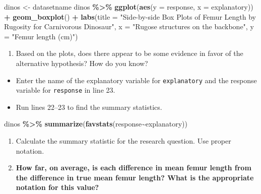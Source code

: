\documentclass[
]{report}
\newenvironment{Shaded}{\begin{snugshade}}{\end{snugshade}}
\newcommand{\AttributeTok}[1]{\textcolor[rgb]{0.13,0.29,0.53}{#1}}
\newcommand{\FunctionTok}[1]{\textcolor[rgb]{0.13,0.29,0.53}{\textbf{#1}}}
\newcommand{\NormalTok}[1]{#1}
\newcommand{\OtherTok}[1]{\textcolor[rgb]{0.56,0.35,0.01}{#1}}
\newcommand{\SpecialCharTok}[1]{\textcolor[rgb]{0.81,0.36,0.00}{\textbf{#1}}}
\newcommand{\StringTok}[1]{\textcolor[rgb]{0.31,0.60,0.02}{#1}}
\providecommand{\tightlist}{%
  \setlength{\itemsep}{0pt}\setlength{\parskip}{0pt}}
\begin{document}
\begin{Shaded}
\begin{Highlighting}[]
\NormalTok{dinos }\OtherTok{\textless{}{-}}\NormalTok{ datasetname}
\NormalTok{dinos }\SpecialCharTok{\%\textgreater{}\%}
  \FunctionTok{ggplot}\NormalTok{(}\FunctionTok{aes}\NormalTok{(}\AttributeTok{y =}\NormalTok{ response, }\AttributeTok{x =}\NormalTok{ explanatory)) }\SpecialCharTok{+}
  \FunctionTok{geom\_boxplot}\NormalTok{() }\SpecialCharTok{+}
  \FunctionTok{labs}\NormalTok{(}\AttributeTok{title =} \StringTok{"Side{-}by{-}side Box Plots of Femur Length by Rugosity}
\StringTok{       for Carnivorous Dinosaur"}\NormalTok{,}
       \AttributeTok{x =} \StringTok{"Rugose structures on the backbone"}\NormalTok{,}
       \AttributeTok{y =} \StringTok{"Femur length (cm)"}\NormalTok{)}
\end{Highlighting}
\end{Shaded}

\begin{enumerate}
\def\labelenumi{\arabic{enumi}.}
\setcounter{enumi}{5}
\tightlist
\item
  Based on the plots, does there appear to be some evidence in favor of the alternative hypothesis? How do you know?
  \vspace{0.4in}
\end{enumerate}

\begin{itemize}
\item
  Enter the name of the explanatory variable for \texttt{explanatory} and the response variable for \texttt{response} in line 23.
\item
  Run lines 22--23 to find the summary statistics.
\end{itemize}

\begin{Shaded}
\begin{Highlighting}[]
\NormalTok{dinos }\SpecialCharTok{\%\textgreater{}\%} 
    \FunctionTok{summarize}\NormalTok{(}\FunctionTok{favstats}\NormalTok{(response}\SpecialCharTok{\textasciitilde{}}\NormalTok{explanatory))}
\end{Highlighting}
\end{Shaded}

\begin{enumerate}
\def\labelenumi{\arabic{enumi}.}
\setcounter{enumi}{6}
\item
  Calculate the summary statistic for the research question. Use proper notation.
  \vspace{0.3in}
\item
  \textbf{How far, on average, is each difference in mean femur length from the difference in true mean femur length? What is the appropriate notation for this value?}
\end{enumerate}
\end{document}
